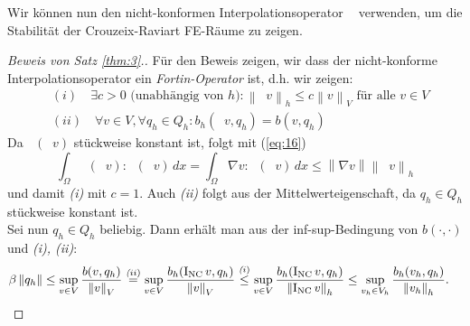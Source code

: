 \documentclass[a4paper]{scrartcl}
\newcommand{\mesh}{\mathcal{T}_h}
\newcommand{\edges}{\mathcal{E}}
\newcommand{\dx}{\,dx}
\newcommand{\vnorm}[1]{\left\lVert#1\right\rVert_V}
\newcommand{\norm}[1]{\left\lVert#1\right\rVert}
\newcommand{\hnorm}[1]{\left\lVert#1\right\rVert_h}
\DeclareMathOperator{\nablah}{\nabla_{\textit{h}}}
\DeclareMathOperator{\intOp}{I_{NC}}
\DeclareMathOperator{\LtwoOp}{\Pi_0}
\theoremstyle{plain}
\theoremstyle{definition}
\theoremstyle{remark}
\begin{document}

\noindent Wir können nun den nicht-konformen Interpolationsoperator \(\intOp\)
verwenden, um die Stabilität der Crouzeix-Raviart FE-Räume zu zeigen. 

\begin{proof}[Beweis von Satz \ref{thm:3}.]
  Für den Beweis zeigen, wir dass der nicht-konforme
  Interpolationsoperator ein \emph{Fortin-Operator} ist, d.h. wir
  zeigen: 
 \begin{align}     
   &(i) \quad \exists c > 0 \text{ (unabhängig von } h\text{)} \colon
   \hnorm{\intOp v} \leq c \vnorm{v} \text{ für alle } v \in V \nonumber\\ 
   &(ii) \quad \forall v \in V, \forall q_h \in Q_h\colon b_h(\intOp v, q_h) = b(v, q_h) \nonumber
   \label{align:2} 
  \end{align}
  Da \(\nablah (\intOp v)\) stückweise konstant ist, folgt mit
  (\ref{eq:16})
  \begin{equation}
    \label{eq:18}
    \int_\Omega \nablah (\intOp v) : \nablah (\intOp v) \dx = 
    \int_\Omega \nabla v : \nablah (\intOp v) \dx \leq \norm{\nabla v}\hnorm{\intOp v}
  \end{equation}
  und damit \emph{(i)} mit \(c=1\). Auch \emph{(ii)} folgt aus der
  Mittelwerteigenschaft, da \(q_h \in Q_h\) stückweise konstant ist. \\ 
  Sei nun \(q_h \in Q_h\) beliebig. Dann erhält man aus der
  inf-sup-Bedingung von \(b(\cdot, \cdot)\) und \emph{(i), (ii)}: 
  \begin{align}
    \beta \norm{q_h} 
    &\leq \sup_{v\in V} \frac{b(v,q_h)}{\vnorm{v}}
    \overset{\emph(ii)}{=} \sup_{v\in V} \frac{b_h(\intOp v,q_h)}{\vnorm{v}}
    \overset{\emph(i)}{\leq} \sup_{v\in V} \frac{b_h(\intOp v,q_h)}{\hnorm{\intOp v}} \nonumber 
    \leq \sup_{v_h\in V_h} \frac{b_h(v_h,q_h)}{\hnorm{v_h}}. \nonumber
  \end{align}
\end{proof}
\end{document}

